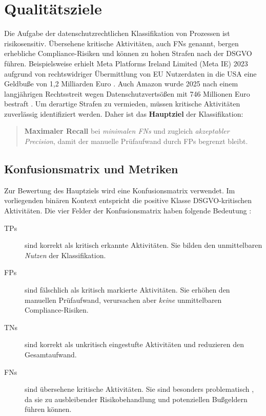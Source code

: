 \section{Qualitätsziele}\label{sec:qualitatsziele}

Die Aufgabe der datenschutzrechtlichen Klassifikation von Prozessen ist risikosensitiv. Übersehene kritische Aktivitäten, auch \acp{FN} genannt, bergen erhebliche Compliance-Risiken und können zu hohen Strafen nach der \ac{DSGVO} führen. Beispielsweise erhielt Meta Platforms Ireland Limited (Meta IE) 2023 aufgrund von rechtswidriger Übermittlung von \ac{EU} Nutzerdaten in die USA eine Geldbuße von 1,2 Milliarden Euro \cite{edpb-meta-fine}. Auch Amazon wurde 2025 nach einem langjährigen Rechtsstreit wegen Datenschutzvertsößen mit 746 Millionen Euro bestraft \cite{datenschutzticker-amazon-fine, reuters-amazon-fine}. Um derartige Strafen zu vermieden, müssen kritische Aktivitäten zuverlässig identifiziert werden. Daher ist das \textbf{Hauptziel} der Klassifikation:

\begin{quote}
    \textbf{Maximaler Recall} bei \emph{minimalen \acp{FN}} und zugleich \emph{akzeptabler Precision}, damit der manuelle Prüfaufwand durch \acp{FP} begrenzt bleibt.
\end{quote}

\subsection*{Konfusionsmatrix und Metriken}

Zur Bewertung des Hauptziels wird eine Konfusionsmatrix verwendet. Im vorliegenden binären Kontext entspricht die positive Klasse \ac{DSGVO}-kritischen Aktivitäten. Die vier Felder der Konfusionsmatrix haben folgende Bedeutung \cite{sokolova2009measureclassification}:

\begin{description}
    \item [\acp{TP}] sind korrekt als kritisch erkannte Aktivitäten. Sie bilden den unmittelbaren \emph{Nutzen} der Klassifikation.
    \item [\acp{FP}] sind fälschlich als kritisch markierte Aktivitäten. Sie erhöhen den manuellen Prüfaufwand, verursachen aber \emph{keine} unmittelbaren Compliance-Risiken.
    \item[\acp{TN}] sind korrekt als unkritisch eingestufte Aktivitäten und reduzieren den Gesamtaufwand.
    \item[\acp{FN}] sind übersehene kritische Aktivitäten. Sie sind besonders problematisch \cite{nake2023towards}, da sie zu ausbleibender Risikobehandlung und potenziellen Bußgeldern führen können.
\end{description}

